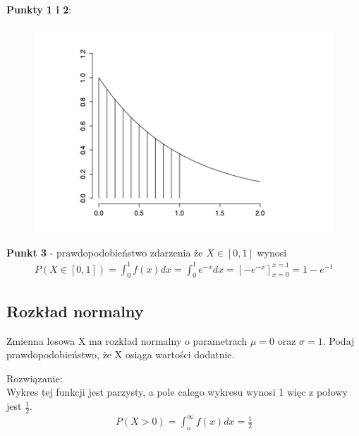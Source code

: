 \documentclass[12pt]{article}
\begin{document}
    \textbf{Punkty 1 i 2}:
    \begin{figure}[H]
        \includegraphics[width=\linewidth]{10_2.png}
    \end{figure}

    \textbf{Punkt 3} - prawdopodobieństwo zdarzenia że $X \in [0,1]$ wynosi
    \begin{align*}
        P(X \in [0,1]) = \int_0^1 f(x) dx = \int_0^1 e^{-x} dx = [-e^{-x}]_{x=0}^{x=1} = 1 - e^{-1}
    \end{align*}


    \subsection{Rozkład normalny}
    \begin{exercise}
        Zmienna losowa X ma rozkład normalny o parametrach $\mu = 0$ oraz $\sigma = 1$. Podaj prawdopodobieństwo, że
        X osiąga wartości dodatnie.
    \end{exercise}
    Rozwiązanie:\\

    Wykres tej funkcji jest parzysty, a pole calego wykresu wynosi 1 więc z połowy jest $\frac{1}{2}$.
    \begin{align*}
        P(X > 0) =  \int_o^{\infty} f(x)dx = \frac{1}{2}
    \end{align*}
\end{document}
